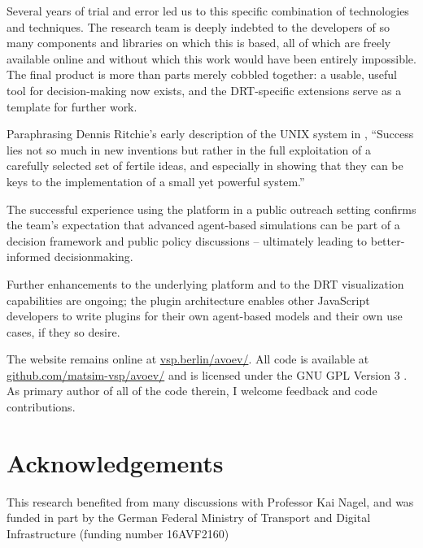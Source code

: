 Several years of trial and error led us to this specific combination of technologies and techniques. The research team is deeply indebted to the developers of so many components and libraries on which this is based, all of which are freely available online and without which this work would have been entirely impossible. The final product is more than parts merely cobbled together: a usable, useful tool for decision-making now exists, and the DRT-specific extensions serve as a template for further work.

Paraphrasing Dennis Ritchie's early description of the UNIX system in \citet{Ritchie1978unix}, ``Success lies not so much in new inventions but rather in the full exploitation of a carefully selected set of fertile ideas, and especially in showing that they can be keys to the implementation of a small yet powerful system.''

The successful experience using the platform in a public outreach setting confirms the team's expectation that advanced agent-based simulations can be part of a decision framework and public policy discussions -- ultimately leading to better-informed decisionmaking.

Further enhancements to the underlying platform and to the DRT visualization capabilities are ongoing; the plugin architecture enables other JavaScript developers to write plugins for their own agent-based models and their own use cases, if they so desire.

The website remains online at \href{https://vsp.berlin/avoev/}{vsp.berlin/avoev/}. All code is available at \href{https://github.com/matsim-vsp/avoev}{github.com/matsim-vsp/avoev/} and is licensed under the GNU GPL Version 3 \cite{FSF2007GnuGPL}. As primary author of all of the code therein, I welcome feedback and code contributions.

\section{Acknowledgements}
This research benefited from many discussions with Professor Kai Nagel, and was funded in part by the German Federal Ministry of Transport and Digital Infrastructure (funding number 16AVF2160)
